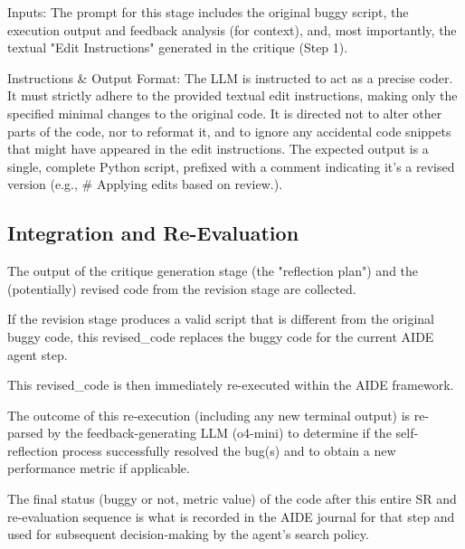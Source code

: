 Inputs: The prompt for this stage includes the original buggy script, the execution output and feedback analysis (for context), and, most importantly, the textual "Edit Instructions" generated in the critique (Step 1).

Instructions \& Output Format: The LLM is instructed to act as a precise coder. It must strictly adhere to the provided textual edit instructions, making only the specified minimal changes to the original code. It is directed not to alter other parts of the code, nor to reformat it, and to ignore any accidental code snippets that might have appeared in the edit instructions. The expected output is a single, complete Python script, prefixed with a comment indicating it's a revised version (e.g., \# Applying edits based on review.).


\subsection{Integration and Re-Evaluation}

The output of the critique generation stage (the "reflection plan") and the (potentially) revised code from the revision stage are collected.

If the revision stage produces a valid script that is different from the original buggy code, this revised\_code replaces the buggy code for the current AIDE agent step.

This revised\_code is then immediately re-executed within the AIDE framework.

The outcome of this re-execution (including any new terminal output) is re-parsed by the feedback-generating LLM (o4-mini) to determine if the self-reflection process successfully resolved the bug(s) and to obtain a new performance metric if applicable.

The final status (buggy or not, metric value) of the code after this entire SR and re-evaluation sequence is what is recorded in the AIDE journal for that step and used for subsequent decision-making by the agent's search policy.


